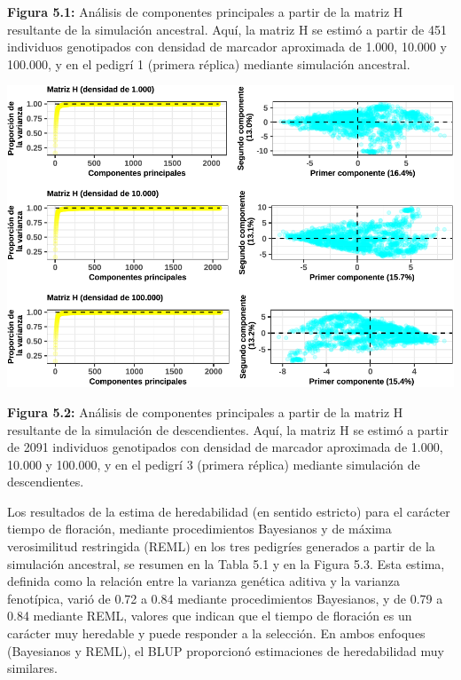 \documentclass[11pt,spanish,a4paper,oneside,]{book} %
\begin{document}
\noindent
\textbf{Figura 5.1:} Análisis de componentes principales a partir de la matriz H resultante de la simulación ancestral. Aquí, la matriz H se estimó a partir de 451 individuos genotipados con densidad de marcador aproximada de 1.000, 10.000 y 100.000, y en el pedigrí 1 (primera réplica) mediante simulación ancestral.

\begin{center}\includegraphics[width=1\linewidth]{figures/Graf_PCA_mH_SeqBreed} \end{center}

\noindent
\textbf{Figura 5.2:} Análisis de componentes principales a partir de la matriz H resultante de la simulación de descendientes. Aquí, la matriz H se estimó a partir de 2091 individuos genotipados con densidad de marcador aproximada de 1.000, 10.000 y 100.000, y en el pedigrí 3 (primera réplica) mediante simulación de descendientes.

\hspace*{1em}

Los resultados de la estima de heredabilidad (en sentido estricto) para el carácter tiempo de floración, mediante procedimientos Bayesianos y de máxima verosimilitud restringida (REML) en los tres pedigríes generados a partir de la simulación ancestral, se resumen en la Tabla 5.1 y en la Figura 5.3. Esta estima, definida como la relación entre la varianza genética aditiva y la varianza fenotípica, varió de 0.72 a 0.84 mediante procedimientos Bayesianos, y de 0.79 a 0.84 mediante REML, valores que indican que el tiempo de floración es un carácter muy heredable y puede responder a la selección. En ambos enfoques (Bayesianos y REML), el BLUP proporcionó estimaciones de heredabilidad muy similares.
\end{document}
